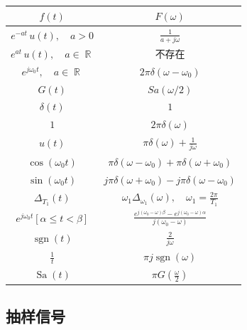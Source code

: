 \documentclass{ctexart}
\DeclareMathOperator{\Rset}{\mathbb{R}}
\DeclareMathOperator{\sgn}{\mathrm{sgn}}
\DeclareMathOperator{\Sa}{\mathrm{Sa}}
\begin{document}
    \begin{table}[ht!]
        \centering
        \begin{tabular}{|c|c|}
                \hline $\displaystyle f(t)$ & $\displaystyle F(\omega)$ \\ \hline
                $\displaystyle e^{-at}\,u(t),\quad a > 0$ & $\displaystyle \frac{1}{a + j \omega}$ \\ \hline
                $\displaystyle e^{at}\,u(t),\quad a \in \Rset$ & 不存在 \\ \hline
                $\displaystyle e^{j \omega_0 t},\quad a \in \Rset$ & $\displaystyle 2 \pi \delta(\omega - \omega_0)$ \\ \hline
                $\displaystyle G(t)$ & $\displaystyle Sa(\omega / 2)$ \\ \hline
                $\displaystyle \delta(t)$ & $\displaystyle 1$ \\ \hline
                $\displaystyle 1$ & $\displaystyle 2\pi \delta(\omega)$ \\ \hline
                $\displaystyle u(t)$ & $\displaystyle \pi\delta(\omega) + \frac{1}{j\omega}$ \\ \hline
                $\displaystyle \cos (\omega_0 t)$ & $\displaystyle \pi \delta(\omega - \omega_0) + \pi \delta(\omega + \omega_0)$ \\ \hline
                $\displaystyle \sin (\omega_0 t)$ & $\displaystyle j \pi \delta(\omega + \omega_0) - j \pi \delta(\omega - \omega_0)$ \\ \hline
                $\displaystyle \Delta_{T_1} (t)$ & $\displaystyle \omega_1 \Delta_{\omega_1}(\omega),\quad \omega_1 = \frac{2\pi}{T_1}$ \\ \hline
                $\displaystyle e^{j \omega_0 t} [\alpha \le t < \beta]$ & $\displaystyle \frac{e^{j(\omega_0 - \omega)\beta} - e^{j(\omega_0-\omega)\alpha}}{j (\omega_0 - \omega)}$ \\ \hline
                $\displaystyle \sgn(t)$ & $\displaystyle \frac{2}{j\omega}$\\\hline
                $\displaystyle \frac{1}{t}$ & $\displaystyle \pi j \sgn(\omega)$\\\hline
                $\displaystyle \Sa(t)$ & $\displaystyle \pi G \left( \frac{\omega}{2} \right) $\\ \hline
        \end{tabular}
    \end{table}

\subsection{抽样信号}
\end{document}
